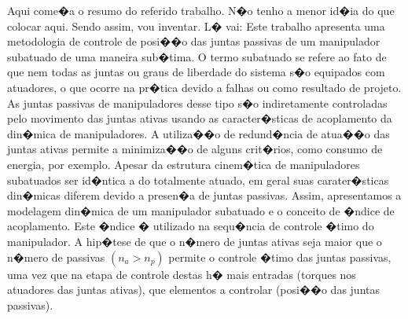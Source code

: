 Aqui come�a o resumo do referido trabalho. N�o tenho a menor id�ia do que colocar aqui. Sendo assim, vou inventar. L� vai: Este trabalho apresenta uma metodologia de controle de posi��o das juntas passivas de um manipulador subatuado de uma maneira sub�tima. O termo subatuado se refere ao fato de que nem todas as juntas ou graus de liberdade do sistema s�o equipados com atuadores, o que ocorre na pr�tica devido a falhas ou como resultado de projeto. As juntas passivas de manipuladores desse tipo s�o indiretamente controladas pelo movimento das juntas ativas usando as caracter�sticas de acoplamento da din�mica de manipuladores. A utiliza��o de redund�ncia de atua��o das juntas ativas permite a minimiza��o de alguns crit�rios, como consumo de energia, por exemplo.
Apesar da estrutura cinem�tica de manipuladores subatuados ser id�ntica a do totalmente atuado, em geral suas carater�sticas din�micas diferem devido a presen�a de juntas passivas. Assim, apresentamos a modelagem din�mica de um manipulador subatuado e o conceito de �ndice de acoplamento. Este �ndice � utilizado na sequ�ncia de controle �timo do \mbox{manipulador}.
A hip�tese de que o n�mero de juntas ativas seja maior que o n�mero de
passivas  $(n_{a} > n_{p})$  permite o controle �timo das juntas passivas, uma vez que na etapa de controle destas h� mais entradas (torques nos atuadores das juntas ativas), que elementos a controlar (posi��o das juntas passivas). 